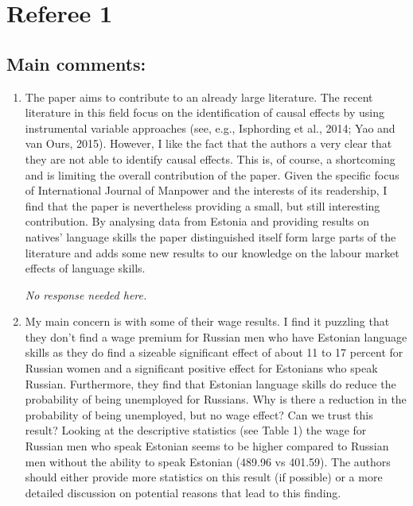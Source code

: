 \documentclass{article}
\newenvironment{response}
{\slshape}{}
\begin{document}
\section{Referee 1}

\subsection{Main comments:}


\begin{enumerate}
\item The paper aims to contribute to an already large
  literature. The recent literature in this field focus on the
  identification of causal effects by using instrumental variable
  approaches (see, e.g., Isphording et al., 2014; Yao and van Ours,
  2015). However, I like the fact that the authors a very clear that
  they are not able to identify causal effects. This is, of course, a
  shortcoming and is limiting the overall contribution of the
  paper. Given the specific focus of International Journal of Manpower
  and the interests of its readership, I find that the paper is
  nevertheless providing a small, but still interesting
  contribution. By analysing data from Estonia and providing results
  on natives’ language skills the paper distinguished itself form
  large parts of the literature and adds some new results to our
  knowledge on the labour market effects of language skills.

  \begin{response}
    No response needed here.
  \end{response}
\item 
  My main concern is with some of their wage results. I find it
  puzzling that they don’t find a wage premium for Russian men who
  have Estonian language skills as they do find a sizeable significant
  effect of about 11 to 17 percent for Russian women and a significant
  positive effect for Estonians who speak Russian. Furthermore, they
  find that Estonian language skills do reduce the probability of
  being unemployed for Russians. Why is there a reduction in the
  probability of being unemployed, but no wage effect? Can we trust
  this result? Looking at the descriptive statistics (see Table 1) the
  wage for Russian men who speak Estonian seems to be higher compared
  to Russian men without the ability to speak Estonian (489.96 vs
  401.59). The authors should either provide more statistics on this
  result (if possible) or a more detailed discussion on potential
  reasons that lead to this finding.


\end{enumerate}
\end{document}
